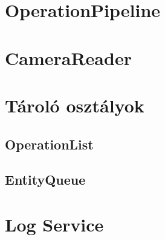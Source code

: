 \section{OperationPipeline}

\section{CameraReader}

\section{Tároló osztályok}
\subsection{OperationList}

\subsection{EntityQueue}

\section{Log Service}
